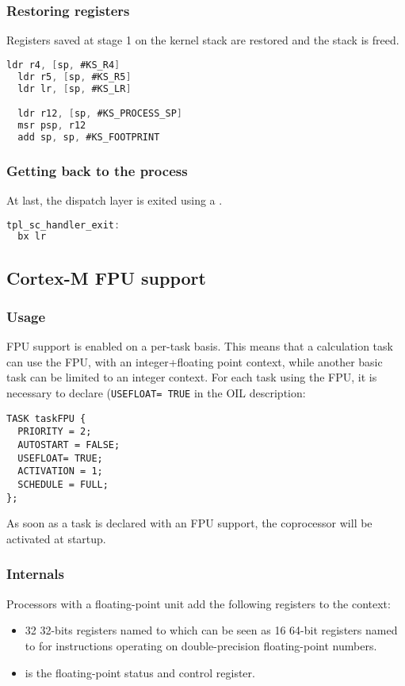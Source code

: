 \subsubsection{Restoring registers}

Registers saved at stage 1 on the kernel stack are restored and the stack is freed.

\begin{lstlisting}[language=C]
  ldr r4, [sp, #KS_R4]
  ldr r5, [sp, #KS_R5]
  ldr lr, [sp, #KS_LR]

  ldr r12, [sp, #KS_PROCESS_SP]
  msr psp, r12
  add sp, sp, #KS_FOOTPRINT	
\end{lstlisting}

\subsubsection{Getting back to the process}

At last, the dispatch layer is exited using a .

\begin{lstlisting}[language=C]
tpl_sc_handler_exit:
  bx lr
\end{lstlisting}

\subsection{Cortex-M FPU support}

\subsubsection{Usage}
FPU support is enabled on a per-task basis. This means that a calculation task can use the FPU, with an integer+floating point context, while another basic task can be limited to an integer context.  For each task using the FPU, it is necessary to declare (\texttt{USEFLOAT= TRUE} in the OIL description: 
\begin{lstlisting}[language=OIL]
TASK taskFPU {
  PRIORITY = 2;
  AUTOSTART = FALSE;
  USEFLOAT= TRUE;
  ACTIVATION = 1;
  SCHEDULE = FULL;
};
\end{lstlisting}
As soon as a task is declared with an FPU support, the coprocessor will be activated at startup. 

\subsubsection{Internals}

Processors with a floating-point unit add the following registers to the context:
\begin{itemize}
\item 32 32-bits registers named  to  which can be seen as 16 64-bit registers named  to  for instructions operating on double-precision floating-point numbers.
\item {} is the floating-point status and control register.
\end{itemize}

